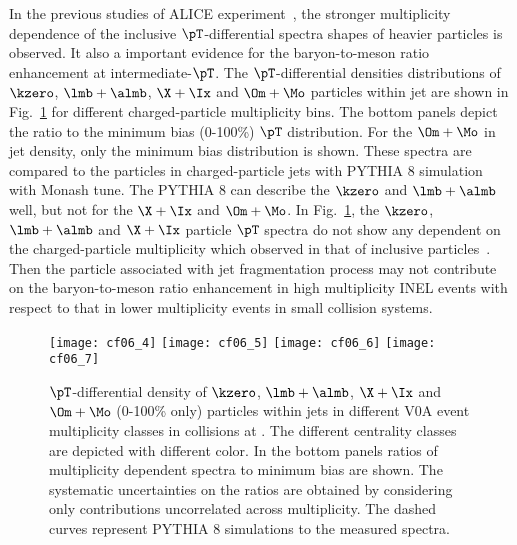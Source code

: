 \documentclass[ALICE,manyauthors]{cernphprep}
\begin{document}
In the previous studies of ALICE experiment~\cite{ALICE:2015mpp, ALICE:2016dei, ALICE:2013wgn}, the stronger multiplicity dependence of the inclusive $\pT$-differential spectra shapes of heavier particles is observed.
It also a important evidence for the baryon-to-meson ratio enhancement at intermediate-$\pT$.
The $\pT$-differential densities distributions of $\kzero$, $\lmb + \almb$, $\X + \Ix$ and $\Om + \Mo$ particles within jet are shown in Fig.~\ref{fig:pPbSpectwCent} for different charged-particle multiplicity bins.
The bottom panels depict the ratio to the minimum bias (0-100\%) $\pT$ distribution.
For the $\Om + \Mo$ in jet density, only the minimum bias distribution is shown.
These spectra are compared to the particles in charged-particle jets with PYTHIA 8 simulation with Monash tune.
The PYTHIA 8 can describe the $\kzero$ and $\lmb + \almb$ well, but not for the $\X + \Ix$ and $\Om + \Mo$.
In Fig.~\ref{fig:pPbSpectwCent}, the $\kzero$, $\lmb + \almb$ and $\X + \Ix$  particle $\pT$ spectra do not show any dependent on the charged-particle multiplicity which observed in that of inclusive particles~\cite{ALICE:2015mpp, ALICE:2016dei, ALICE:2013wgn}. 
Then the particle associated with jet fragmentation process may not contribute on the baryon-to-meson ratio enhancement in high multiplicity INEL events with respect to that in lower multiplicity events in small collision systems.

\begin{figure}[!ht]
	\begin{center}
		\texttt{[image: cf06\_4]}
		\texttt{[image: cf06\_5]}
		\texttt{[image: cf06\_6]}
		\texttt{[image: cf06\_7]}
	\end{center}
	\caption{$\pT$-differential density of $\kzero$, $\lmb + \almb$, $\X + \Ix$ and $\Om + \Mo$ (0-100\% only) particles within jets in different V0A event multiplicity classes in \pPb collisions at \fivenn. The different centrality classes are depicted with different color. In the bottom panels ratios of multiplicity dependent spectra to minimum bias are shown. The systematic uncertainties on the ratios are obtained by considering only contributions uncorrelated across multiplicity.
	The dashed curves represent PYTHIA 8 simulations to the measured spectra.
	}
	\label{fig:pPbSpectwCent}
\end{figure}
\end{document}
